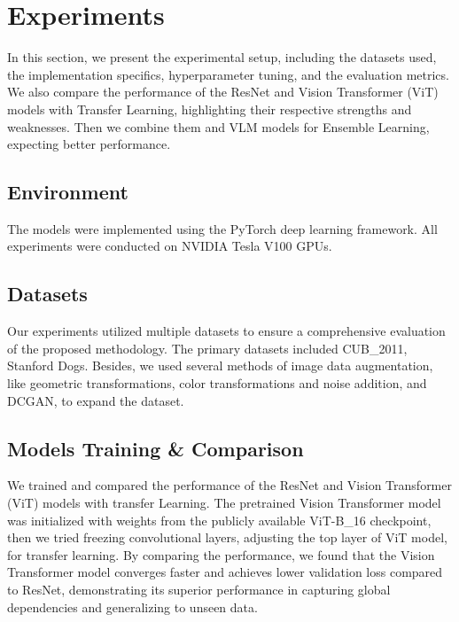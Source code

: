 \section{Experiments}
\label{sec:experiments}

In this section, we present the experimental setup, including the datasets used, the implementation specifics, hyperparameter tuning, and the evaluation metrics. We also compare the performance of the ResNet and Vision Transformer (ViT) models with Transfer Learning, highlighting their respective strengths and weaknesses. Then we combine them and VLM models for Ensemble Learning, expecting better performance.


\subsection{Environment}
The models were implemented using the PyTorch deep learning framework. All experiments were conducted on NVIDIA Tesla V100 GPUs.

\subsection{Datasets}
Our experiments utilized multiple datasets to ensure a comprehensive evaluation of the proposed methodology. The primary datasets included CUB\_2011, Stanford Dogs. Besides, we used several methods of image data augmentation, like geometric transformations, color transformations and noise addition, and DCGAN, to expand the dataset.

\subsection{Models Training \& Comparison}
We trained and compared the performance of the ResNet and Vision Transformer (ViT) models with transfer Learning. The pretrained Vision Transformer model was initialized with weights from the publicly available ViT-B\_16 checkpoint, then we tried freezing convolutional layers, adjusting the top layer of ViT model, for transfer learning. By comparing the performance, we found that the Vision Transformer model converges faster and achieves lower validation loss compared to ResNet, demonstrating its superior performance in capturing global dependencies and generalizing to unseen data.

